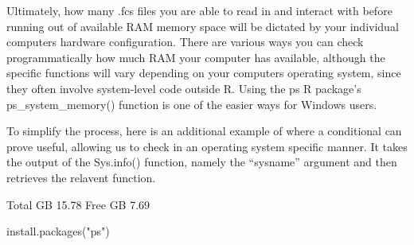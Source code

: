 \documentclass[
  letterpaper,
  DIV=11,
  numbers=noendperiod]{scrartcl}
\newenvironment{Shaded}{\begin{snugshade}}{\end{snugshade}}
\newcommand{\ControlFlowTok}[1]{\textcolor[rgb]{0.00,0.23,0.31}{\textbf{#1}}}
\newcommand{\DecValTok}[1]{\textcolor[rgb]{0.68,0.00,0.00}{#1}}
\newcommand{\FunctionTok}[1]{\textcolor[rgb]{0.28,0.35,0.67}{#1}}
\newcommand{\NormalTok}[1]{\textcolor[rgb]{0.00,0.23,0.31}{#1}}
\newcommand{\OtherTok}[1]{\textcolor[rgb]{0.00,0.23,0.31}{#1}}
\newcommand{\SpecialCharTok}[1]{\textcolor[rgb]{0.37,0.37,0.37}{#1}}
\newcommand{\StringTok}[1]{\textcolor[rgb]{0.13,0.47,0.30}{#1}}
\begin{document}
Ultimately, how many .fcs files you are able to read in and interact
with before running out of available RAM memory space will be dictated
by your individual computers hardware configuration. There are various
ways you can check programmatically how much RAM your computer has
available, although the specific functions will vary depending on your
computers operating system, since they often involve system-level code
outside R. Using the ps R package's ps\_system\_memory() function is one
of the easier ways for Windows users.

To simplify the process, here is an additional example of where a
conditional can prove useful, allowing us to check in an operating
system specific manner. It takes the output of the Sys.info() function,
namely the ``sysname'' argument and then retrieves the relavent
function.

\begin{Shaded}
\end{Shaded}

Total GB 15.78 Free GB 7.69

\begin{Shaded}
\begin{Highlighting}[]
\FunctionTok{install.packages}\NormalTok{(}\StringTok{"ps"}\NormalTok{)}
\end{Highlighting}
\end{Shaded}

\begin{Shaded}
\end{Shaded}
\end{document}
